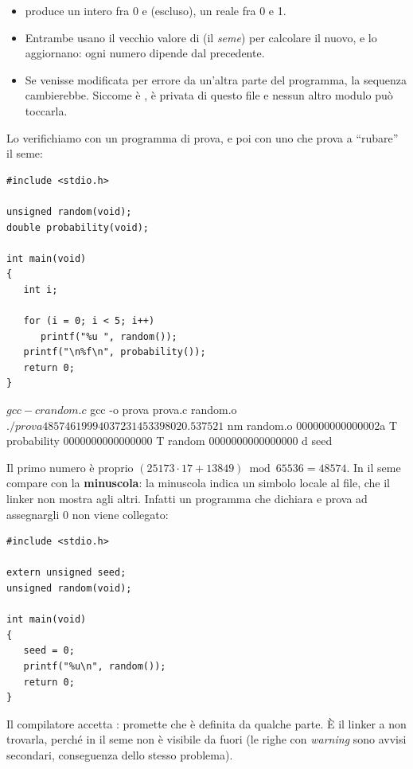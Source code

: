 \begin{itemize}
  \item {} produce un intero fra 0 e  (escluso),
         un reale fra 0 e 1.
  \item Entrambe usano il vecchio valore di  (il \textit{seme})
        per calcolare il nuovo, e lo aggiornano: ogni numero dipende dal
        precedente.
  \item Se  venisse modificata per errore da un'altra parte del
        programma, la sequenza cambierebbe. Siccome è , è
        privata di questo file e nessun altro modulo può toccarla.
\end{itemize}

Lo verifichiamo con un programma di prova, e poi con uno che prova a
“rubare” il seme:

\begin{affianco}[0.5][c]
\begin{lstlisting}[style=c, name=prova.c]
#include <stdio.h>

unsigned random(void);
double probability(void);

int main(void)
{
   int i;

   for (i = 0; i < 5; i++)
      printf("%u ", random());
   printf("\n%f\n", probability());
   return 0;
}
\end{lstlisting}
\risultato
\begin{console}
$ gcc -c random.c
$ gcc -o prova prova.c random.o
$ ./prova
48574 61999 40372 31453 39802
0.537521
$ nm random.o
000000000000002a T probability
0000000000000000 T random
0000000000000000 d seed
\end{console}
\end{affianco}

Il primo numero è proprio $(25173 \cdot 17 + 13849) \bmod 65536 = 48574$.
In  il seme compare con la  \textbf{minuscola}: la
minuscola indica un simbolo locale al file, che il linker non mostra agli
altri. Infatti un programma che dichiara  e
prova ad assegnargli 0 non viene collegato:

\begin{affianco}[0.42][c]
\begin{lstlisting}[style=c, name=ruba.c]
#include <stdio.h>

extern unsigned seed;
unsigned random(void);

int main(void)
{
   seed = 0;
   printf("%u\n", random());
   return 0;
}
\end{lstlisting}
\risultato
Il compilatore accetta :  promette che 
è definita da qualche parte. È il linker a non trovarla, perché in
 il seme non è visibile da fuori (le righe con
\textit{warning} sono avvisi secondari, conseguenza dello stesso problema).
\end{affianco}

